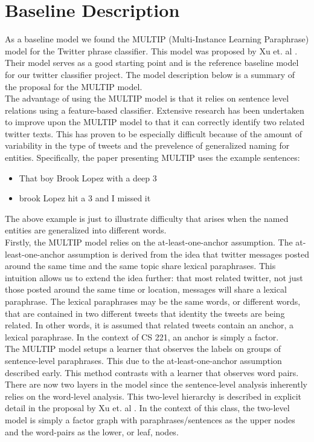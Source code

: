 \documentclass[conference]{IEEEtran}
\begin{document}
\section{Baseline Description}
As a baseline model we found the MULTIP (Multi-Instance Learning Paraphrase) model for the Twitter phrase classifier. This model was proposed by Xu et. al \cite{zane}. Their model serves as a good starting point and is the reference baseline model for our twitter classifier project. The model description below is a summary of the proposal for the MULTIP model. \\

The advantage of using the MULTIP model is that it relies on sentence level relations using a feature-based classifier. Extensive research has been undertaken to improve upon the MULTIP model to that it can correctly identify two related twitter texts. This has proven to be especially difficult because of the amount of variability in the type of tweets and the prevelence of generalized naming for entities. Specifically, the paper presenting MULTIP uses the example sentences:

\begin{itemize}
\item That boy Brook Lopez with a deep 3
\item brook Lopez hit a 3 and I missed it
\end{itemize}

The above example is just to illustrate difficulty that arises when the named entities are generalized into different words. \\

Firstly, the MULTIP model relies on the at-least-one-anchor assumption. The at-least-one-anchor assumption is derived from the idea that twitter messages posted around the same time and the same topic share lexical paraphrases. This intuition allows us to extend the idea further: that most related twitter, not just those posted around the same time or location, messages will share a lexical paraphrase. The lexical paraphrases may be the same words, or different words, that are contained in two different tweets that identity the tweets are being related. In other words, it is assumed that related tweets contain an anchor, a lexical paraphrase. In the context of CS 221, an anchor is simply a factor. \\

The MULTIP model setups a learner that observes the labels on groups of sentence-level paraphrases. This due to the at-least-one-anchor assumption described early. This method contrasts with a learner that observes word pairs. There are now two layers in the model since the sentence-level analysis inherently relies on the word-level analysis. This two-level hierarchy is described in explicit detail in the proposal by Xu et. al \cite{zane}. In the context of this class, the two-level model is simply a factor graph with paraphrases/sentences as the upper nodes and the word-pairs as the lower, or leaf, nodes.\medskip
\end{document}
